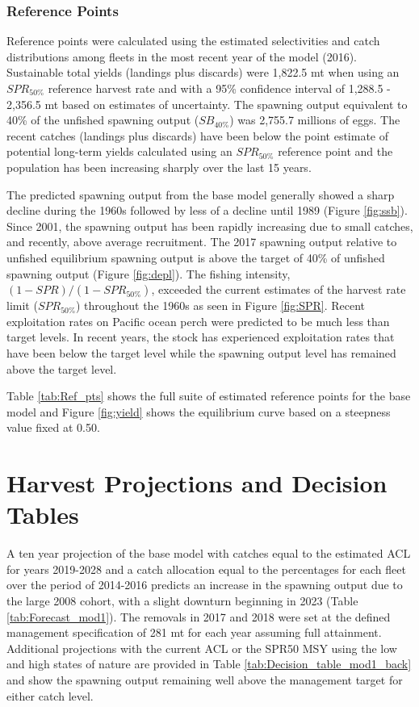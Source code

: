 \documentclass[12pt,]{article}
\begin{document}
\subsubsection{Reference Points}\label{reference-points-1}

Reference points were calculated using the estimated selectivities and
catch distributions among fleets in the most recent year of the model
(2016). Sustainable total yields (landings plus discards) were 1,822.5
mt when using an \(SPR_{50\%}\) reference harvest rate and with a 95\%
confidence interval of 1,288.5 - 2,356.5 mt based on estimates of
uncertainty. The spawning output equivalent to 40\% of the unfished
spawning output (\(SB_{40\%}\)) was 2,755.7 millions of eggs. The recent
catches (landings plus discards) have been below the point estimate of
potential long-term yields calculated using an \(SPR_{50\%}\) reference
point and the population has been increasing sharply over the last 15
years.

The predicted spawning output from the base model generally showed a
sharp decline during the 1960s followed by less of a decline until 1989
(Figure \ref{fig:ssb}). Since 2001, the spawning output has been rapidly
increasing due to small catches, and recently, above average
recruitment. The 2017 spawning output relative to unfished equilibrium
spawning output is above the target of 40\% of unfished spawning output
(Figure \ref{fig:depl}). The fishing intensity,
\((1-SPR)/(1-SPR_{50\%})\), exceeded the current estimates of the
harvest rate limit (\(SPR_{50\%}\)) throughout the 1960s as seen in
Figure \ref{fig:SPR}. Recent exploitation rates on Pacific ocean perch
were predicted to be much less than target levels. In recent years, the
stock has experienced exploitation rates that have been below the target
level while the spawning output level has remained above the target
level.

Table \ref{tab:Ref_pts} shows the full suite of estimated reference
points for the base model and Figure \ref{fig:yield} shows the
equilibrium curve based on a steepness value fixed at 0.50.

\section{Harvest Projections and Decision
Tables}\label{harvest-projections-and-decision-tables}

A ten year projection of the base model with catches equal to the
estimated ACL for years 2019-2028 and a catch allocation equal to the
percentages for each fleet over the period of 2014-2016 predicts an
increase in the spawning output due to the large 2008 cohort, with a
slight downturn beginning in 2023 (Table \ref{tab:Forecast_mod1}). The
removals in 2017 and 2018 were set at the defined management
specification of 281 mt for each year assuming full attainment.
Additional projections with the current ACL or the SPR50 MSY using the
low and high states of nature are provided in Table
\ref{tab:Decision_table_mod1_back} and show the spawning output
remaining well above the management target for either catch level.
\end{document}

